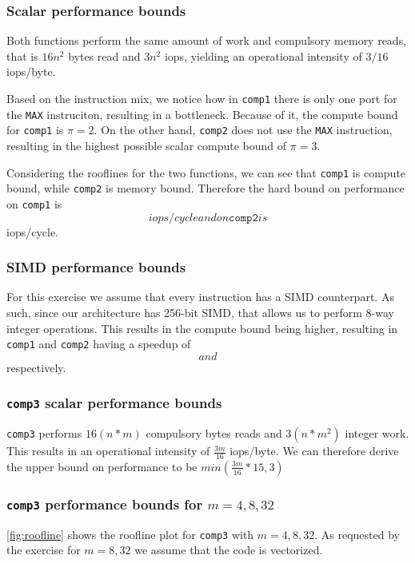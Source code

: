 \subsubsection{Scalar performance bounds}
Both functions perform the same amount of work and compulsory memory reads, that is $16n^2$ bytes read and $3n^2$ iops, yielding an operational intensity of $3/16$ iops/byte.

Based on the instruction mix, we notice how in \texttt{comp1} there is only one port for the \texttt{MAX} instruciton, resulting in a bottleneck. Because of it, the compute bound for \texttt{comp1} is $\pi=2$. On the other hand, \texttt{comp2} does not use the \texttt{MAX} instruction, resulting in the highest possible scalar compute bound of $\pi=3$.

Considering the rooflines for the two functions, we can see that \texttt{comp1} is compute bound, while \texttt{comp2} is memory bound. Therefore the hard bound on performance on \texttt{comp1} is $$ iops/cycle and on \texttt{comp2} is $$ iops/cycle.

\subsubsection{SIMD performance bounds}
For this exercise we assume that every instruction has a SIMD counterpart. As such, since our architecture has 256-bit SIMD, that allows us to perform 8-way integer operations. This results in the compute bound being higher, resulting in \texttt{comp1} and \texttt{comp2} having a speedup of $$ and $$ respectively.

\subsubsection{\texttt{comp3} scalar performance bounds}
\texttt{comp3} performs $16(n*m)$ compulsory bytes reads and $3(n*m^2)$ integer work. This results in an operational intensity of $\frac{3m}{16}$ iops/byte. We can therefore derive the upper bound on performance to be $min(\frac{3m}{16}*15, 3)$

\subsubsection{\texttt{comp3} performance bounds for $m=4,8,32$}
\autoref{fig:roofline} shows the roofline plot for \texttt{comp3} with $m=4,8,32$. As requested by the exercise for $m=8,32$ we assume that the code is vectorized.




